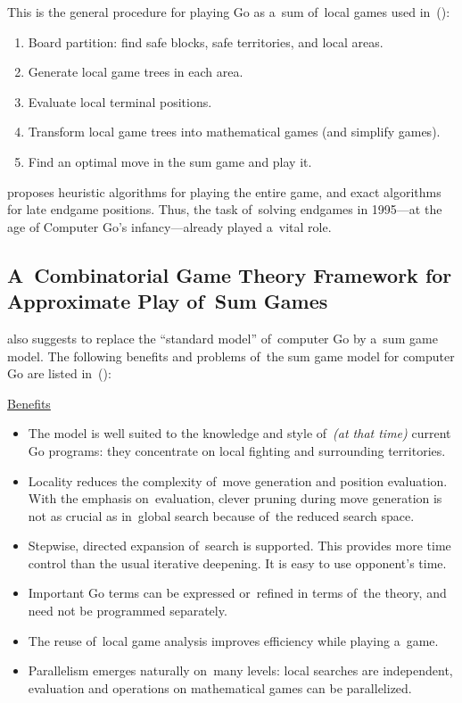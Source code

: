 This is the general procedure for playing Go as a~sum of~local games used in~(\cite{Muller1995computer}):
\begin{enumerate}
  \item Board partition: find safe blocks, safe territories, and local areas.
  \item Generate local game trees in each area.
  \item Evaluate local terminal positions.
  \item Transform local game trees into mathematical games (and simplify games).
  \item Find an optimal move in the sum game and play it.
\end{enumerate}
\Mueller{} proposes heuristic algorithms for playing the entire game, and exact algorithms for late endgame positions.
Thus, the task of~solving endgames in 1995---at the age of Computer Go's infancy---already played a~vital role.

\subsection{A~Combinatorial Game Theory Framework for Approximate Play of~Sum Games}

\Mueller{} also suggests to replace the ``standard model'' of~computer Go by a~sum game model.
The following benefits and problems of~the sum game model for computer Go are listed in~(\cite{Muller1995computer}):

\medskip

\underline{Benefits}
\begin{itemize}[+]
  \item The model is well suited to the knowledge and style of~\textit{(at that time)} current Go programs:
    they concentrate on local fighting and surrounding territories.
  \item Locality reduces the complexity of~move generation and position evaluation.
    With the emphasis on~evaluation, clever pruning during move generation is not as crucial as in~global search because of~the reduced search space.
  \item Stepwise, directed expansion of~search is supported.
    This provides more time control than the usual iterative deepening.
    It is easy to use opponent's time.
  \item Important Go terms can be expressed or~refined in terms of~the theory, and need not be programmed separately.
  \item The reuse of~local game analysis improves efficiency while playing a~game.
  \item Parallelism emerges naturally on~many levels: local searches are independent, evaluation and operations on mathematical games can be parallelized.
\end{itemize}

